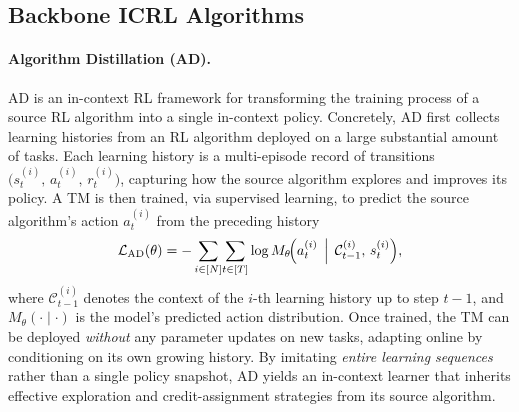\documentclass{article}
\newcommand{\gL}{\mathcal{L}}
\def\ccalC{{\ensuremath{\mathcal C}}}
\begin{document}
\subsection{Backbone ICRL Algorithms}
\label{append_backboneICRLalgo}
\paragraph{Algorithm Distillation (AD).}
AD \citep{laskin2022context} is an in-context RL framework for transforming the training process of a source RL algorithm into a single in-context policy. Concretely, AD first collects learning histories from an RL algorithm deployed on a large substantial amount of tasks. Each learning history is a multi-episode record of transitions $\bigl(s_t^{(i)},\,a_t^{(i)},\,r_t^{(i)}\bigr)$, capturing how the source algorithm explores and improves its policy. A TM is then trained, via supervised learning, to predict the source algorithm’s action $a_t^{(i)}$ from the preceding history
\begin{equation}
\label{eq:ad}
\gL_{\mathrm{AD}}(\theta)
=
- \sum_{i \in [N]}\!
  \sum_{t \in [T]}
  \log
  M_{\theta}\!\Bigl(
      a_t^{(i)}
      \,\Bigm|\,
      \ccalC_{t-1}^{(i)},\,
      s_t^{(i)}
  \Bigr),
\end{equation}
 where $\ccalC_{t-1}^{(i)}$ denotes the context of the $i$-th learning history up to step $t{-}1$, and $M_\theta(\cdot\mid\cdot)$ is the model’s predicted action distribution. Once trained, the TM can be deployed \emph{without} any parameter updates on new tasks, adapting online by conditioning on its own growing history. By imitating \emph{entire learning sequences} rather than a single policy snapshot, AD yields an in-context learner that inherits effective exploration and credit-assignment strategies from its source algorithm.
\end{document}
